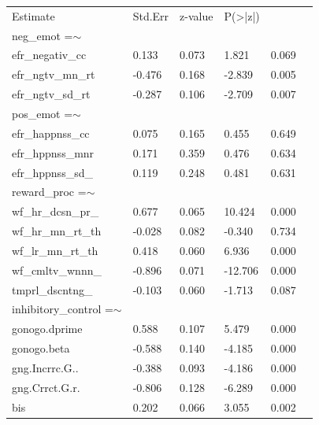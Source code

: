 \documentclass[utf8]{frontiersSCNS} %
\begin{document}
\begin{table}[]
\begin{tabular}{llllll}
Estimate                    & Std.Err & z-value & P(\textgreater{}|z|) &       &  \\
neg\_emot =$\sim$           &         &         &                      &       &  \\
efr\_negativ\_cc            & 0.133   & 0.073   & 1.821                & 0.069 &  \\
efr\_ngtv\_mn\_rt           & -0.476  & 0.168   & -2.839               & 0.005 &  \\
efr\_ngtv\_sd\_rt           & -0.287  & 0.106   & -2.709               & 0.007 &  \\
pos\_emot =$\sim$           &         &         &                      &       &  \\
efr\_happnss\_cc            & 0.075   & 0.165   & 0.455                & 0.649 &  \\
efr\_hppnss\_mnr            & 0.171   & 0.359   & 0.476                & 0.634 &  \\
efr\_hppnss\_sd\_           & 0.119   & 0.248   & 0.481                & 0.631 &  \\
reward\_proc =$\sim$        &         &         &                      &       &  \\
wf\_hr\_dcsn\_pr\_          & 0.677   & 0.065   & 10.424               & 0.000 &  \\
wf\_hr\_mn\_rt\_th          & -0.028  & 0.082   & -0.340               & 0.734 &  \\
wf\_lr\_mn\_rt\_th          & 0.418   & 0.060   & 6.936                & 0.000 &  \\
wf\_cmltv\_wnnn\_           & -0.896  & 0.071   & -12.706              & 0.000 &  \\
tmprl\_dscntng\_            & -0.103  & 0.060   & -1.713               & 0.087 &  \\
inhibitory\_control =$\sim$ &         &         &                      &       &  \\
gonogo.dprime               & 0.588   & 0.107   & 5.479                & 0.000 &  \\
gonogo.beta                 & -0.588  & 0.140   & -4.185               & 0.000 &  \\
gng.Incrrc.G..              & -0.388  & 0.093   & -4.186               & 0.000 &  \\
gng.Crrct.G.r.              & -0.806  & 0.128   & -6.289               & 0.000 &  \\
bis                         & 0.202   & 0.066   & 3.055                & 0.002 & 
\end{tabular}
\end{table}
\end{document}
